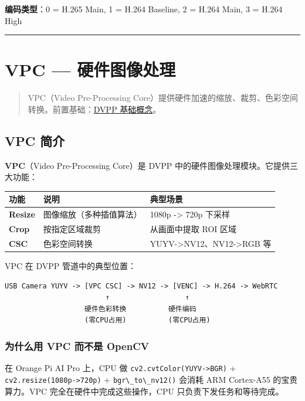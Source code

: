 \textbf{编码类型}：0 = H.265 Main, 1 = H.264 Baseline, 2 = H.264 Main, 3
= H.264 High

\begin{center}\rule{0.5\linewidth}{0.5pt}\end{center}

\section{VPC --- 硬件图像处理}\label{vpc}

\begin{quote}
VPC（Video Pre-Processing
Core）提供硬件加速的缩放、裁剪、色彩空间转换。前置基础：\hyperref[dvpp-basics]{DVPP
基础概念}。
\end{quote}

\subsection{VPC 简介}\label{src-book-chapter6-h84}

\textbf{VPC}（Video Pre-Processing Core）是 DVPP
中的硬件图像处理模块。它提供三大功能：

\begin{longtable}[]{@{}lll@{}}
\toprule\noalign{}
功能 & 说明 & 典型场景 \\
\midrule\noalign{}
\endhead
\bottomrule\noalign{}
\endlastfoot
\textbf{Resize} & 图像缩放（多种插值算法） & 1080p -\textgreater{} 720p
下采样 \\
\textbf{Crop} & 按指定区域裁剪 & 从画面中提取 ROI 区域 \\
\textbf{CSC} & 色彩空间转换 &
YUYV-\textgreater NV12、NV12-\textgreater RGB 等 \\
\end{longtable}

VPC 在 DVPP 管道中的典型位置：

\begin{lstlisting}
USB Camera YUYV -> [VPC CSC] -> NV12 -> [VENC] -> H.264 -> WebRTC
                        ↑                  ↑
                   硬件色彩转换          硬件编码
                   (零CPU占用)          (零CPU占用)
\end{lstlisting}

\subsubsection{为什么用 VPC 而不是 OpenCV}\label{src-book-chapter6-h85}

在 Orange Pi AI Pro 上，CPU 做
\passthrough{\lstinline!cv2.cvtColor(YUYV->BGR)!} +
\passthrough{\lstinline!cv2.resize(1080p->720p)!} +
\passthrough{\lstinline!bgr\_to\_nv12()!} 会消耗 ARM Cortex-A55
的宝贵算力。VPC 完全在硬件中完成这些操作，CPU 只负责下发任务和等待完成。

